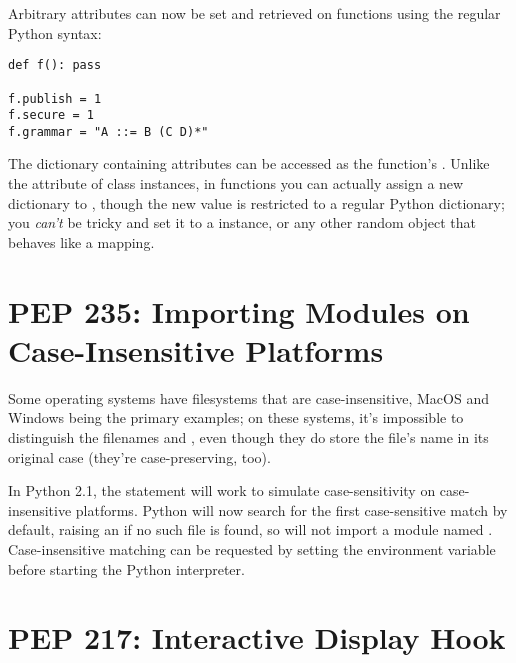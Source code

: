 \documentclass{howto}
\begin{document}
Arbitrary attributes can now be set and retrieved on functions using the
regular Python syntax:

\begin{verbatim}
def f(): pass

f.publish = 1
f.secure = 1
f.grammar = "A ::= B (C D)*"
\end{verbatim}

The dictionary containing attributes can be accessed as the function's
. Unlike the  attribute of class
instances, in functions you can actually assign a new dictionary to
, though the new value is restricted to a regular
Python dictionary; you \emph{can't} be tricky and set it to a
 instance, or any other random object that behaves
like a mapping.

\begin{seealso}


\end{seealso}



\section{PEP 235: Importing Modules on Case-Insensitive Platforms}

Some operating systems have filesystems that are case-insensitive,
MacOS and Windows being the primary examples; on these systems, it's
impossible to distinguish the filenames  and
, even though they do store the file's name 
in its original case (they're case-preserving, too).

In Python 2.1, the  statement will work to simulate
case-sensitivity on case-insensitive platforms.  Python will now
search for the first case-sensitive match by default, raising an
 if no such file is found, so 
will not import a module named .  Case-insensitive
matching can be requested by setting the  environment
variable before starting the Python interpreter.

\section{PEP 217: Interactive Display Hook}
\end{document}
